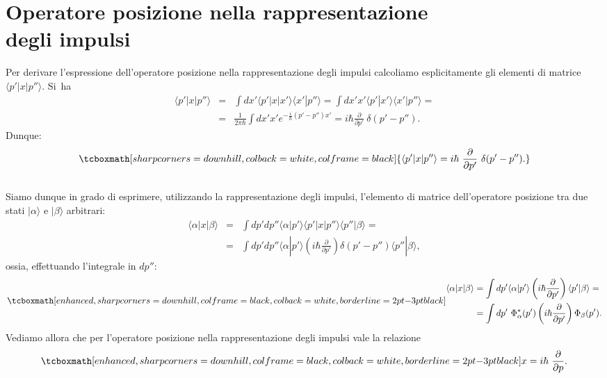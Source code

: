 \section[Operatore posizione nella rappresentazione degli impulsi]{Operatore posizione nella rappresentazione\\degli impulsi}
Per derivare l'espressione dell'operatore posizione nella rappresentazione degli impulsi calcoliamo esplicitamente gli elementi di matrice $\langle p' | x | p'' \rangle$. Si~ha
	\begin{eqnarray}
		\langle p' | x | p'' \rangle &=& \int dx' \langle p' | x | x' \rangle \langle x' | p'' \rangle =  \int dx' x' \langle p' | x' \rangle \langle x' | p'' \rangle = \nonumber\\
		&=& \frac{1}{2 \pi \hbar} \int dx' x' e^{-\frac{i}{\hbar} (p'-p'') x'} =   i \hbar \frac{\partial}{\partial p'} ~\delta(p' - p'').
	\end{eqnarray}
Dunque:
	\begin{equation}
		\tcboxmath[sharp corners=downhill, colback=white, colframe=black]{		
			\langle p' | x | p'' \rangle = i \hbar~ \frac{\partial}{\partial p'} ~\delta(p' - p'').
			}
	\end{equation}\\
	
Siamo dunque in grado di esprimere, utilizzando la rappresentazione degli impulsi, l'elemento di matrice dell'operatore posizione tra due stati $| \alpha \rangle$ e $| \beta \rangle$ arbitrari:
	\begin{eqnarray}
		\langle \alpha | x | \beta \rangle &=& \int dp' dp'' \langle \alpha | p' \rangle \langle p' | x | p'' \rangle \langle p'' | \beta \rangle = \nonumber \\
		&=& \int dp' dp'' \langle \alpha | p' \rangle \left(i \hbar \frac{\partial}{\partial p'} \right) \delta(p'-p'') \langle p'' | \beta \rangle,
	\end{eqnarray}
ossia, effettuando l'integrale in $dp''$:
	\begin{equation}
		\tcboxmath[enhanced, sharp corners=downhill, colframe=black, colback=white, borderline={2pt}{-3pt}{black}]{
		\begin{aligned}
			\langle \alpha | x | \beta \rangle &= \int dp' \langle \alpha | p' \rangle \left(i \hbar \frac{\partial}{\partial p'} \right) \langle p' | \beta \rangle = \\
			&= \int dp'~ \Phi ^* _\alpha(p') \left(i \hbar \frac{\partial}{\partial p'} \right) \Phi_\beta(p').
		\end{aligned}
		}
	\end{equation}
Vediamo allora che per l'operatore posizione nella rappresentazione degli impulsi vale la relazione
	\begin{equation}
		\tcboxmath[enhanced, sharp corners=downhill, colframe=black, colback=white, borderline={2pt}{-3pt}{black}]{
			x = i \hbar~ \frac{\partial}{\partial p} .
			}
	\end{equation}
